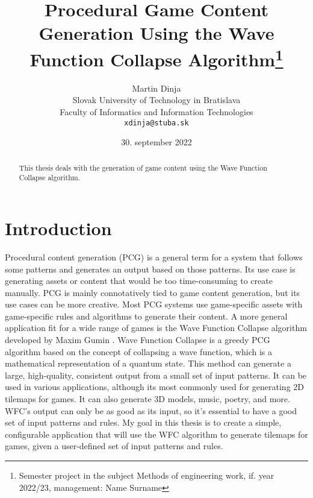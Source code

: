 \documentclass[10pt,twoside,a4paper]{article}
\title{Procedural Game Content Generation Using the Wave Function Collapse Algorithm\thanks{Semester project in the subject Methods of engineering work, if. year 2022/23, management: Name Surname}}
\author{Martin Dinja\\[2pt]
	{\small Slovak University of Technology in Bratislava}\\
	{\small Faculty of Informatics and Information Technologies}\\
	{\small \texttt{xdinja@stuba.sk}}
}
\date{\small 30. september 2022}
\begin{document}
\maketitle

\tableofcontents

\begin{abstract}
    \begin{center}
        This thesis deals with the generation of game content using the Wave Function Collapse algorithm. 
    \end{center}
\end{abstract}

\section{Introduction}\label{sec:introduction}

Procedural content generation (PCG) is a general term for a system that follows some patterns and generates an output based on those patterns.
Its use case is generating assets or content that would be too time-consuming to create manually.
PCG is mainly connotatively tied to game content generation, but its use cases can be more creative.
Most PCG systems use game-specific assets with game-specific rules and algorithms to generate their content.
A more general application fit for a wide range of games is the Wave Function Collapse algorithm developed by Maxim Gumin \cite{WFC}.
Wave Function Collapse is a greedy PCG algorithm based on the concept of collapsing a wave function, which is a mathematical representation of a quantum state.
This method can generate a large, high-quality, consistent output from a small set of input patterns.
It can be used in various applications, although its most commonly used for generating 2D tilemaps for games.
It can also generate 3D models, music, poetry, and more.
WFC's output can only be as good as its input, so it's essential to have a good set of input patterns and rules. 
My goal in this thesis is to create a simple, configurable application that will use the WFC algorithm to generate tilemaps for games, given a user-defined set of input patterns and rules.
\end{document}
